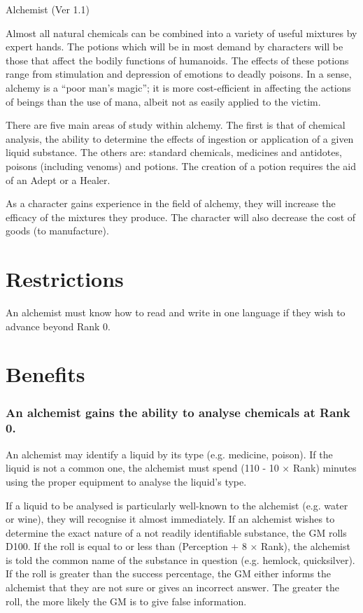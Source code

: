 \begin{Chapter}{Alchemist (Ver 1.1)}

Almost all natural chemicals can be combined into a variety of useful
mixtures by expert hands.  The potions which will be in most demand by
characters will be those that affect the bodily functions of
humanoids. The effects of these potions range from stimulation and
depression of emotions to deadly poisons.  In a sense, alchemy is a
“poor man’s magic”; it is more cost-efficient in affecting the actions
of beings than the use of mana, albeit not as easily applied to the
victim.

There are five main areas of study within alchemy.  The first is that
of chemical analysis, the ability to determine the effects of
ingestion or application of a given liquid substance.  The others are:
standard chemicals, medicines and antidotes, poisons (including
venoms) and potions.  The creation of a potion requires the aid of an
Adept or a Healer.

As a character gains experience in the field of alchemy, they will
increase the efficacy of the mixtures they produce.  The character
will also decrease the cost of goods (to manufacture).

\section{Restrictions}

An alchemist must know how to read and write in one language if they
wish to advance beyond Rank 0.

\section{Benefits}

\subsubsection{An alchemist gains the ability to analyse chemicals at Rank 0.}

An alchemist may identify a liquid by its type (e.g.  medicine,
poison).  If the liquid is not a common one, the alchemist must spend
(110 - 10 × Rank) minutes using the proper equipment to analyse the
liquid’s type.

If a liquid to be analysed is particularly well-known to the alchemist
(e.g.  water or wine), they will recognise it almost immediately.  If
an alchemist wishes to determine the exact nature of a not readily
identifiable substance, the GM rolls D100.  If the roll is equal to or
less than (Perception + 8 × Rank), the alchemist is told the common
name of the substance in question (e.g. hemlock, quicksilver).  If the
roll is greater than the success percentage, the GM either informs the
alchemist that they are not sure or gives an incorrect answer.  The
greater the roll, the more likely the GM is to give false information.


\end{Chapter}

